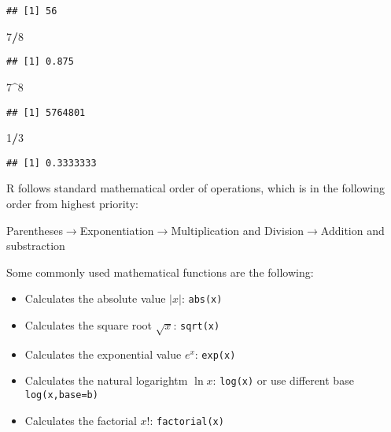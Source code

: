 \documentclass[
]{article}
\newenvironment{Shaded}{\begin{snugshade}}{\end{snugshade}}
\newcommand{\DecValTok}[1]{\textcolor[rgb]{0.00,0.00,0.81}{#1}}
\newcommand{\SpecialCharTok}[1]{\textcolor[rgb]{0.81,0.36,0.00}{\textbf{#1}}}
\providecommand{\tightlist}{%
  \setlength{\itemsep}{0pt}\setlength{\parskip}{0pt}}
\begin{document}
\begin{verbatim}
## [1] 56
\end{verbatim}

\begin{Shaded}
\begin{Highlighting}[]
\DecValTok{7}\SpecialCharTok{/}\DecValTok{8}
\end{Highlighting}
\end{Shaded}

\begin{verbatim}
## [1] 0.875
\end{verbatim}

\begin{Shaded}
\begin{Highlighting}[]
\DecValTok{7}\SpecialCharTok{\^{}}\DecValTok{8}
\end{Highlighting}
\end{Shaded}

\begin{verbatim}
## [1] 5764801
\end{verbatim}

\begin{Shaded}
\begin{Highlighting}[]
\DecValTok{1}\SpecialCharTok{/}\DecValTok{3}
\end{Highlighting}
\end{Shaded}

\begin{verbatim}
## [1] 0.3333333
\end{verbatim}

R follows standard mathematical order of operations, which is in the
following order from highest priority:

Parentheses\(\rightarrow\)Exponentiation\(\rightarrow\)Multiplication
and Division\(\rightarrow\)Addition and substraction

Some commonly used mathematical functions are the following:

\begin{itemize}
\tightlist
\item
  Calculates the absolute value \(|x|\): \texttt{abs(x)}
\item
  Calculates the square root \(\sqrt{x}\): \texttt{sqrt(x)}
\item
  Calculates the exponential value \(e^x\): \texttt{exp(x)}
\item
  Calculates the natural logarightm \(\ln{x}\): \texttt{log(x)} or use
  different base \texttt{log(x,base=b)}
\item
  Calculates the factorial \(x!\): \texttt{factorial(x)}
\end{itemize}
\end{document}
